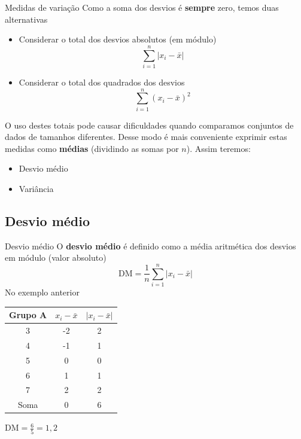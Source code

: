 \documentclass[10pt]{beamer}\usepackage[]{graphicx}\usepackage[]{color}
\theoremstyle{definition}
\begin{document}
\begin{frame}{Medidas de variação}
  Como a soma dos desvios é \textbf{sempre} zero, temos duas alternativas
  \begin{itemize}
  \item Considerar o total dos desvios absolutos (em módulo)
    \begin{equation*}
      \sum_{i=1}^{n} |x_i - \bar{x}|
    \end{equation*}
  \item Considerar o total dos quadrados dos desvios
        \begin{equation*}
      \sum_{i=1}^{n} (x_i - \bar{x})^2
    \end{equation*}
  \end{itemize}
  O uso destes totais pode causar dificuldades quando comparamos
  conjuntos de dados de tamanhos diferentes.
  Desse modo é mais conveniente exprimir estas medidas como
  \textbf{médias} (dividindo as somas por $n$). Assim teremos:
  \begin{itemize}
  \item Desvio médio
  \item Variância
  \end{itemize}
\end{frame}

\subsection{Desvio médio}

\begin{frame}{Desvio médio}
  O \textbf{desvio médio} é definido como a média aritmética dos desvios
  em módulo (valor absoluto)
  \begin{equation*}
    \text{DM} = \frac{1}{n} \sum_{i=1}^{n} |x_i - \bar{x}|
  \end{equation*}
    No exemplo anterior
    \begin{table}[htbp]
    \centering
    \begin{tabular}{ccc}
      \hline
      \textbf{Grupo A} & $x_i - \bar{x}$ & $|x_i - \bar{x}|$ \\ \hline
      3 & -2 & 2 \\
      4 & -1 & 1\\
      5 & 0 & 0\\
      6 & 1 & 1\\
      7 & 2 & 2\\
      \hline
      Soma & 0 & 6\\
      \hline
    \end{tabular}
  \end{table}
  $\text{DM} = \frac{6}{5} = 1,2$
\end{frame}
\end{document}
